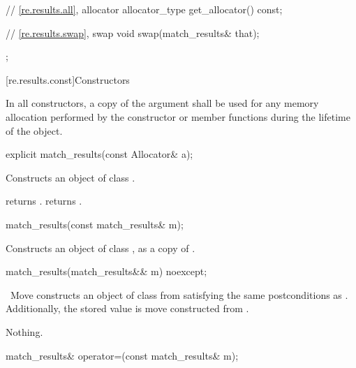 \begin{codeblock}
{{      // \ref{re.results.all}, allocator
      allocator_type get_allocator() const;

      // \ref{re.results.swap}, swap
      void swap(match_results& that);
    };
}
\end{codeblock}

[re.results.const]{Constructors}

\pnum
In all  constructors, a copy of the  argument
shall be used for any memory allocation performed by the constructor
or member functions during the lifetime of the object.

%
\begin{itemdecl}
explicit match_results(const Allocator& a);
\end{itemdecl}

\begin{itemdescr}
\pnum
\effects  Constructs an object of class .

\pnum
\ensures
{} returns .
 returns .
\end{itemdescr}

%
\begin{itemdecl}
match_results(const match_results& m);
\end{itemdecl}

\begin{itemdescr}
\pnum
\effects  Constructs an object of class , as a
copy of .
\end{itemdescr}

%
\begin{itemdecl}
match_results(match_results&& m) noexcept;
\end{itemdecl}

\begin{itemdescr}
\pnum
\effects\ Move constructs an object of class  from 
satisfying the same postconditions as . Additionally,
the stored  value is move constructed from .

\pnum
\throws Nothing.
\end{itemdescr}

%
\begin{itemdecl}
match_results& operator=(const match_results& m);
\end{itemdecl}

